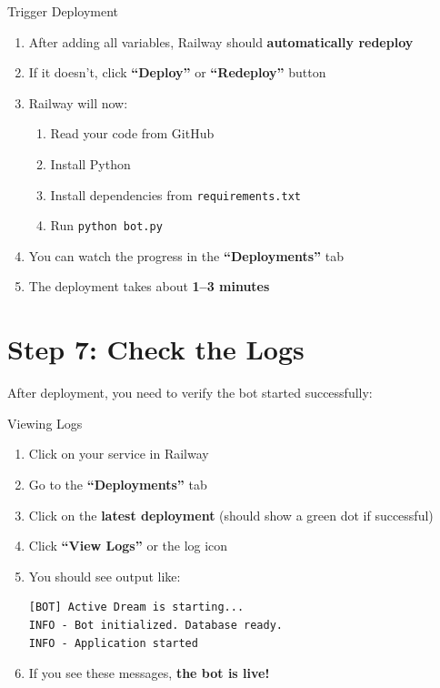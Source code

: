 \begin{stepbox}{Trigger Deployment}
\begin{enumerate}[leftmargin=1.5cm]
    \item After adding all variables, Railway should \textbf{automatically redeploy}
    \item If it doesn't, click \textbf{``Deploy''} or \textbf{``Redeploy''} button
    \item Railway will now:
    \begin{enumerate}
        \item Read your code from GitHub
        \item Install Python
        \item Install dependencies from \texttt{requirements.txt}
        \item Run \texttt{python bot.py}
    \end{enumerate}
    \item You can watch the progress in the \textbf{``Deployments''} tab
    \item The deployment takes about \textbf{1--3 minutes}
\end{enumerate}
\end{stepbox}

\section{Step 7: Check the Logs}

After deployment, you need to verify the bot started successfully:

\begin{stepbox}{Viewing Logs}
\begin{enumerate}[leftmargin=1.5cm]
    \item Click on your service in Railway
    \item Go to the \textbf{``Deployments''} tab
    \item Click on the \textbf{latest deployment} (should show a green dot if successful)
    \item Click \textbf{``View Logs''} or the log icon
    \item You should see output like:
    \begin{lstlisting}[style=termstyle]
[BOT] Active Dream is starting...
INFO - Bot initialized. Database ready.
INFO - Application started
    \end{lstlisting}
    \item If you see these messages, \textbf{the bot is live!}
\end{enumerate}
\end{stepbox}


